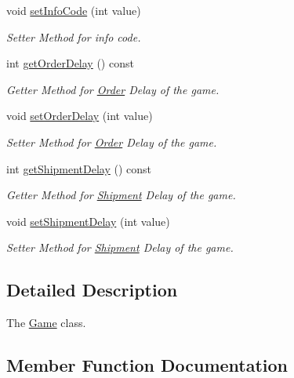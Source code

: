 \begin{DoxyCompactItemize}
$$void \hyperlink{classGame_a392ed0a6d14eaabb35507a08bd5cb527}{set\+Info\+Code} (int value)
\begin{DoxyCompactList}\small\item\em Setter Method for info code. \end{DoxyCompactList}\item 
int \hyperlink{classGame_ab68ef87715311bea275bdac17342f2bd}{get\+Order\+Delay} () const
\begin{DoxyCompactList}\small\item\em Getter Method for \hyperlink{classOrder}{Order} Delay of the game. \end{DoxyCompactList}\item 
void \hyperlink{classGame_ac7a3b5df537efe026c2010f95674b2dc}{set\+Order\+Delay} (int value)
\begin{DoxyCompactList}\small\item\em Setter Method for \hyperlink{classOrder}{Order} Delay of the game. \end{DoxyCompactList}\item 
int \hyperlink{classGame_ab25852cc4c2df47382d33cfe3c2b55d0}{get\+Shipment\+Delay} () const
\begin{DoxyCompactList}\small\item\em Getter Method for \hyperlink{classShipment}{Shipment} Delay of the game. \end{DoxyCompactList}\item 
void \hyperlink{classGame_ae0d4d73857961a54af6d17b055598d11}{set\+Shipment\+Delay} (int value)
\begin{DoxyCompactList}\small\item\em Setter Method for \hyperlink{classShipment}{Shipment} Delay of the game. \end{DoxyCompactList}\end{DoxyCompactItemize}


\subsection{Detailed Description}
The \hyperlink{classGame}{Game} class. 

\subsection{Member Function Documentation}
\mbox{\label{classGame_a2cfb2422cb425f254c0cb455fefa0fb5}} 
